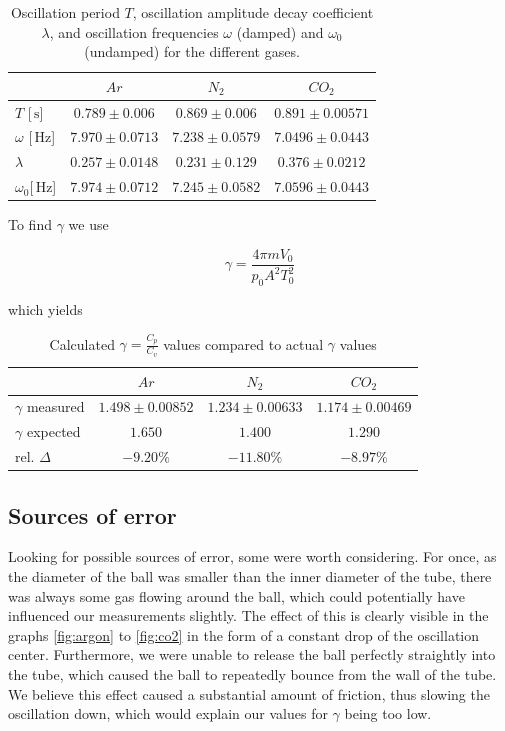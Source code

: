 \documentclass{scrreprt}
\newcommand{\unit}[1]{\ensuremath{\, \mathrm{#1}}}
\begin{document}
\begin{table}[H]
\center
\begin{tabular}{|l|ccc|}
\hline
	&	$Ar$ & $N_2$		&	$CO_2$\\ \hline\hline
$T$ [$\unit{s}$] & $0.789 \pm 0.006$ & $0.869 \pm 0.006$  & $0.891 \pm 0.00571$\\\hline\hline
$\omega$ [$\unit{Hz}$] & $7.970 \pm 0.0713$ & $7.238 \pm 0.0579$ & $7.0496 \pm 0.0443$\\\hline
$\lambda$ & $0.257 \pm 0.0148$ & $0.231 \pm 0.129$ & $0.376 \pm 0.0212$\\ \hline
$\omega_0$[$\unit{Hz}$] & $7.974 \pm 0.0712$ & $7.245 \pm 0.0582$ & $7.0596 \pm 0.0443$ \\ \hline

\end{tabular}
\caption{Oscillation period $T$, oscillation amplitude decay coefficient $\lambda$, and oscillation frequencies $\omega$ (damped) and $\omega_0$ (undamped) for the different gases.}
\end{table}

To find $\gamma$ we use 

\begin{equation}
\gamma = \frac{4 \pi m V_0}{p_0 A^2 T_0^2}
\end{equation}

which yields

\begin{table}[H]
\center
\begin{tabular}{|l|ccc|}
\hline
	&	$Ar$ & $N_2$		&	$CO_2$\\ \hline\hline
$\gamma$ measured & $1.498 \pm 0.00852$ & $1.234 \pm 0.00633$  & $1.174 \pm 0.00469$\\\hline
$\gamma$ expected & $1.650$ & $1.400$ & $1.290$\\ \hline
rel. $\Delta$ & $-9.20\%$ & $-11.80\%$ & $-8.97\%$\\ \hline

\end{tabular}
\caption{Calculated $\gamma = \frac{C_p}{C_v}$ values compared to actual $\gamma$ values }
\end{table}

\subsection{Sources of error}
\label{sec:error}
Looking for possible sources of error, some were worth considering. For once, as the diameter of the ball was smaller than the inner diameter of the tube, there was always some gas flowing around the ball, which could potentially have influenced our measurements slightly. The effect of this is clearly visible in the graphs \ref{fig:argon} to \ref{fig:co2} in the form of a constant drop of the oscillation center. Furthermore, we were unable to release the ball perfectly straightly into the tube, which caused the ball to repeatedly bounce from the wall of the tube. We believe this effect caused a substantial amount of friction, thus slowing the oscillation down, which would explain our values for $\gamma$ being too low.
\end{document}
